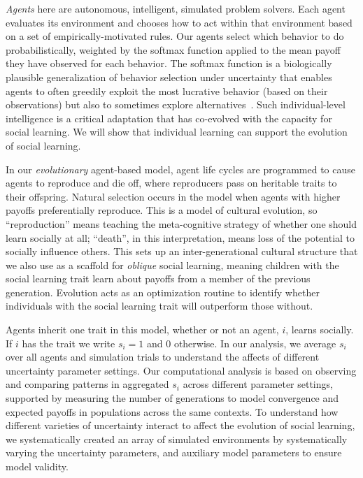 \documentclass[letterpaper,11.5pt]{scrartcl}
\begin{document}
\emph{Agents} here are autonomous, intelligent, simulated problem solvers. Each
agent evaluates its environment and chooses how to act within that environment based
on a set of empirically-motivated rules.  Our agents select which behavior to do
probabilistically, weighted by the softmax function applied to the mean payoff they
have observed for each behavior. The softmax function is a biologically plausible
generalization of behavior selection under uncertainty that enables agents to often
greedily exploit the most lucrative behavior (based on their observations) but also
to sometimes explore alternatives~\cite{Schulz2019,Collins2013,Daw2006,Yechiam2005}.
Such individual-level intelligence is a critical adaptation that has 
co-evolved with the capacity for social learning. We will show that individual
learning can support the evolution of social learning.

In our \emph{evolutionary} agent-based model, agent life cycles are
programmed to cause agents to reproduce and die off, where reproducers pass on
heritable traits to their offspring. 
Natural selection occurs in the model when agents with higher
payoffs preferentially reproduce. This is a model of cultural evolution, so
``reproduction'' means teaching the meta-cognitive strategy of whether one should learn
socially at all; ``death'', in this interpretation, means
loss of the potential to socially influence others. 
This sets up an inter-generational cultural structure
that we also use as a scaffold for \emph{oblique} social learning, meaning children
with the social learning trait learn about payoffs from a member of the
previous generation. Evolution acts as an optimization routine to identify
whether individuals with the social learning trait will outperform those without.  

Agents inherit one trait in this model, whether or not
an agent, $i$, learns socially. If $i$ has the trait we write $s_i=1$
 and 0 otherwise. In our analysis, we 
average $s_i$ over all agents and simulation trials to understand the affects of
different uncertainty parameter settings. 
Our computational analysis is based on observing and comparing patterns in
aggregated $s_i$ across different parameter settings, 
supported by measuring the number of generations 
to model convergence and expected payoffs in populations across the same contexts. 
To understand how different varieties of uncertainty interact
to affect the evolution of social learning, we systematically created an array of
simulated environments by systematically varying the uncertainty parameters, and
auxiliary model parameters to ensure model validity. 
\end{document}
